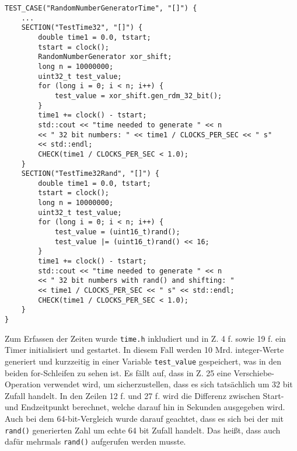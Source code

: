\documentclass[../review_3.tex]{subfiles}
\begin{document}
\begin{lstlisting}[caption= {Test zum Vergleich der Zeiten vom RandomNumberGenerator mit \texttt{rand()}}, label = rngtime]
TEST_CASE("RandomNumberGeneratorTime", "[]") {
    ...
    SECTION("TestTime32", "[]") {
        double time1 = 0.0, tstart;
        tstart = clock();
        RandomNumberGenerator xor_shift;
        long n = 10000000;
        uint32_t test_value;
        for (long i = 0; i < n; i++) {
            test_value = xor_shift.gen_rdm_32_bit();
        }
        time1 += clock() - tstart;
        std::cout << "time needed to generate " << n
        << " 32 bit numbers: " << time1 / CLOCKS_PER_SEC << " s"
        << std::endl;
        CHECK(time1 / CLOCKS_PER_SEC < 1.0);
    }
    SECTION("TestTime32Rand", "[]") {
        double time1 = 0.0, tstart;
        tstart = clock();
        long n = 10000000;
        uint32_t test_value;
        for (long i = 0; i < n; i++) {
            test_value = (uint16_t)rand();
            test_value |= (uint16_t)rand() << 16;
        }
        time1 += clock() - tstart;
        std::cout << "time needed to generate " << n
        << " 32 bit numbers with rand() and shifting: "
        << time1 / CLOCKS_PER_SEC << " s" << std::endl;
        CHECK(time1 / CLOCKS_PER_SEC < 1.0);
    }
}\end{lstlisting}

Zum Erfassen der Zeiten wurde \texttt{time.h} inkludiert und in Z. 4 f. sowie 19 f. ein Timer initialisiert und gestartet. In diesem Fall werden 10 Mrd. integer-Werte generiert und kurzzeitig in einer Variable \texttt{test\_value} gespeichert, was in den beiden for-Schleifen zu sehen ist. Es fällt auf, dass in Z. 25 eine Verschiebe-Operation verwendet wird, um sicherzustellen, dass es sich tatsächlich um 32 bit Zufall handelt. In den Zeilen 12 f. und 27 f. wird die Differenz zwischen Start- und Endzeitpunkt berechnet, welche darauf hin in Sekunden ausgegeben wird. Auch bei dem 64-bit-Vergleich wurde darauf geachtet, dass es sich bei der mit \texttt{rand()} generierten Zahl um echte 64 bit Zufall handelt. Das heißt, dass auch dafür mehrmals \texttt{rand()} aufgerufen werden musste.
\end{document}
